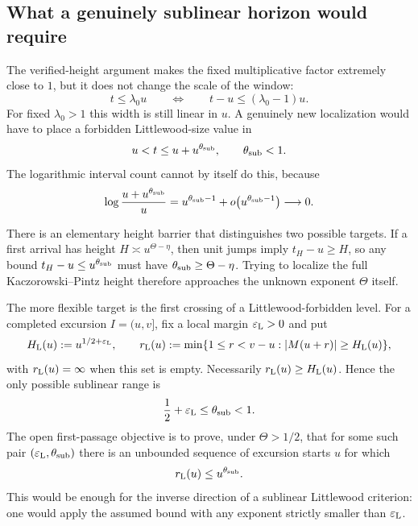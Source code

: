 \documentclass[11pt,reqno]{amsart}
\numberwithin{equation}{section}
\theoremstyle{plain}
\theoremstyle{definition}
\theoremstyle{remark}
\begin{document}
\subsection{What a genuinely sublinear horizon would require}
\label{subsec:sublinear-first-passage}

The verified-height argument makes the fixed multiplicative factor extremely
close to $1$, but it does not change the scale of the window:
\[
 t\le\lambda_0u
 \qquad\Longleftrightarrow\qquad
 t-u\le(\lambda_0-1)u.
\]
For fixed $\lambda_0>1$ this width is still linear in $u$.  A genuinely new
localization would have to place a forbidden Littlewood-size value in
\[
 u<t\le u+u^{\theta_{\rm sub}},
 \qquad \theta_{\rm sub}<1.
\]
The logarithmic interval count cannot by itself do this, because
\[
 \log\frac{u+u^{\theta_{\rm sub}}}{u}
 =
 u^{\theta_{\rm sub}-1}
 +o\!\left(u^{\theta_{\rm sub}-1}\right)
 \longrightarrow0.
\]

There is an elementary height barrier that distinguishes two possible
targets.  If a first arrival has height
$H\asymp u^{\Theta-\eta}$, then unit jumps imply
$t_H-u\ge H$, so any bound
$t_H-u\le u^{\theta_{\rm sub}}$ must have
$\theta_{\rm sub}\ge\Theta-\eta$.  Trying to localize the full
Kaczorowski--Pintz height therefore approaches the unknown exponent
$\Theta$ itself.

The more flexible target is the first crossing of a Littlewood-forbidden
level.  For a completed excursion $I=(u,v]$, fix a local margin
$\varepsilon_{\rm L}>0$ and put
\begin{equation}
\label{eq:littlewood-first-passage}
 H_{\rm L}(u):=u^{1/2+\varepsilon_{\rm L}},\qquad
 r_{\rm L}(u):=
 \min\{1\le r<v-u:|M(u+r)|\ge H_{\rm L}(u)\},
\end{equation}
with $r_{\rm L}(u)=\infty$ when this set is empty.  Necessarily
$r_{\rm L}(u)\ge H_{\rm L}(u)$.  Hence the only possible sublinear range is
\[
 \frac12+\varepsilon_{\rm L}\le\theta_{\rm sub}<1.
\]
The open first-passage objective is to prove, under $\Theta>1/2$, that for
some such pair $(\varepsilon_{\rm L},\theta_{\rm sub})$ there is an
unbounded sequence of excursion starts $u$ for which
\begin{equation}
\label{eq:sublinear-first-passage-target}
 r_{\rm L}(u)\le u^{\theta_{\rm sub}}.
\end{equation}
This would be enough for the inverse direction of a sublinear
Littlewood criterion: one would apply the assumed bound with any exponent
strictly smaller than $\varepsilon_{\rm L}$.
\end{document}
